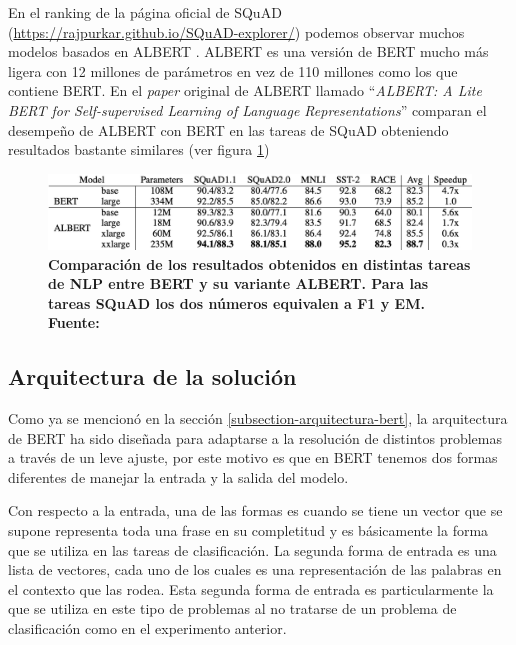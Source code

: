 En el ranking de la página oficial de SQuAD (\url{https://rajpurkar.github.io/SQuAD-explorer/}) podemos observar muchos modelos basados en ALBERT \cite{ALBERT_https://doi.org/10.48550/arxiv.1909.11942}. ALBERT es una versión de BERT mucho más ligera con 12 millones de parámetros en vez de 110 millones como los que contiene BERT. En el \textit{paper} original de ALBERT llamado ``\textit{ALBERT: A Lite BERT for Self-supervised Learning of Language Representations}''  comparan el desempeño de ALBERT con BERT en las tareas de SQuAD obteniendo resultados bastante similares (ver figura \ref{fig-qa-eda-albert})

\begin{figure}[ht!]
    \centering
    \includegraphics[scale=0.5]{figuras/qa-eda-albert.png}
    \caption[Preguntas y Respuestas - Comparación BERT vs humanos]{\textbf{Comparación de los resultados obtenidos en distintas tareas de NLP entre BERT y su variante ALBERT. Para las tareas SQuAD los dos números equivalen a F1 y EM. Fuente: \cite{ALBERT_https://doi.org/10.48550/arxiv.1909.11942}}}
    \label{fig-qa-eda-albert}
\end{figure}


\subsection{Arquitectura de la solución}
\label{subsection-qa-arquitectura-de-la-solucion}

Como ya se mencionó en la sección \ref{subsection-arquitectura-bert}, la arquitectura de BERT ha sido diseñada para adaptarse a la resolución de distintos problemas a través de un leve ajuste, por este motivo es que en BERT tenemos dos formas diferentes de manejar la entrada y la salida del modelo. 

Con respecto a la entrada, una de las formas es cuando se tiene un vector que se supone representa toda una frase en su completitud y es básicamente la forma que se utiliza en las tareas de clasificación. La segunda forma de entrada es una lista de vectores, cada uno de los cuales es una representación de las palabras en el contexto que las rodea. Esta segunda forma de entrada es particularmente la que se utiliza en este tipo de problemas al no tratarse de un problema de clasificación como en el experimento anterior.

